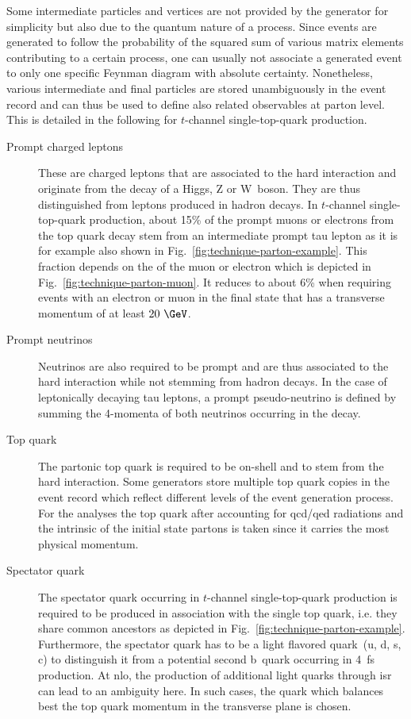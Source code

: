 Some intermediate particles and vertices are not provided by the generator for simplicity but also due to the quantum nature of a process. Since events are generated to follow the probability of the squared sum of various matrix elements contributing to a certain process, one can usually not associate a generated event to only one specific Feynman diagram with absolute certainty. Nonetheless, various intermediate and final particles are stored unambiguously in the event record and can thus be used to define also related observables at parton level. This is detailed in the following for $t$-channel single-top-quark production.
\begin{description}
\item[Prompt charged leptons] These are charged leptons that are associated to the hard interaction and originate from the decay of a Higgs, Z or W~boson. They are thus distinguished from leptons produced in hadron decays. In $t$-channel single-top-quark production, about 15\% of the prompt muons or electrons from the top quark decay stem from an intermediate prompt tau lepton as it is for example also shown in Fig.~\ref{fig:technique-parton-example}. This fraction depends on the \pt of the muon or electron which is depicted in Fig.~\ref{fig:technique-parton-muon}. It reduces to about 6\% when requiring events with an electron or muon in the final state that has a transverse momentum of at least $20~\GeV$.
\item[Prompt neutrinos] Neutrinos are also required to be prompt and are thus associated to the hard interaction while not stemming from hadron decays. In the case of leptonically decaying tau leptons, a prompt pseudo-neutrino is defined by summing the 4-momenta of both neutrinos occurring in the decay.
\item[Top quark] The partonic top quark is required to be on-shell and to stem from the hard interaction. Some generators store multiple top quark copies in the event record which reflect different levels of the event generation process. For the analyses the top quark after accounting for \gls{qcd}/\gls{qed} radiations and the intrinsic \kt of the initial state partons is taken since it carries the most physical momentum.
\item[Spectator quark] The spectator quark occurring in $t$-channel single-top-quark production is required to be produced in association with the single top quark, i.e. they share common ancestors as depicted in Fig.~\ref{fig:technique-parton-example}. Furthermore, the spectator quark has to be a light flavored quark~(u, d, s, c) to distinguish it from a potential second b~quark occurring in 4~\gls{fs} production. At \gls{nlo}, the production of additional light quarks through \gls{isr} can lead to an ambiguity here. In such cases, the quark which balances best the top quark momentum in the transverse plane is chosen.
\end{description}

